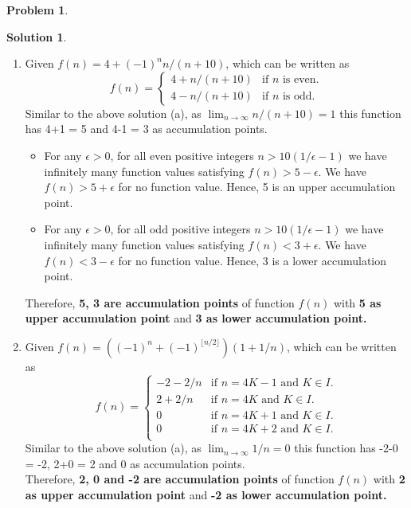\documentclass{article}
\theoremstyle{definition}
\newtheorem{problem}{Problem}
\newtheorem*{solution}{Solution}
\begin{document}
\begin{problem}
\begin{solution}
\begin{enumerate}[label=(\Alph*)]
\item Given $f(n) = 4 + (-1)^nn/(n+10)$, which can be written as
\begin{equation}
  f(n)=\begin{cases}
    4 + n/(n+10) & \text{if $n$ is even}.\\
    4 - n/(n+10) & \text{if $n$ is odd}.
  \end{cases}
\end{equation}
Similar to the above solution (a), as $\lim_{n\to\infty}n/(n+10) = 1$ this function has 4+1 = 5 and 4-1 = 3 as accumulation points.
\begin{itemize}
    \item For any $\epsilon > 0$, for all even positive integers $n > 10(1/\epsilon - 1)$ we have infinitely many function values satisfying $f(n) > 5 - \epsilon$. We have $f(n) > 5 + \epsilon$ for no function value. Hence, 5 is an upper accumulation point.
    \item For any $\epsilon > 0$, for all odd positive integers $n > 10(1/\epsilon - 1)$ we have infinitely many function values satisfying $f(n) < 3 + \epsilon$. We have $f(n) < 3 - \epsilon$ for no function value. Hence, 3 is a lower accumulation point.
\end{itemize}
Therefore, \textbf{5, 3 are accumulation points} of function $f(n)$ with \textbf{5 as upper accumulation point} and \textbf{3 as lower accumulation point.}

\item Given $f(n) = ((-1)^n+(-1)^{\lfloor{n/2}\rfloor})(1 + 1/n)$, which can be written as
\begin{equation}
  f(n)=\begin{cases}
    -2 - 2/n & \text{if $n = 4K - 1$ and $K \in I$}.\\
    2 + 2/n & \text{if $n = 4K$ and $K \in I$}.\\
    0 & \text{if $n = 4K + 1$ and $K \in I$}.\\
    0 & \text{if $n = 4K + 2$ and $K \in I$}.\\
  \end{cases}
\end{equation}
Similar to the above solution (a), as $\lim_{n\to\infty}1/n = 0$ this function has -2-0 = -2, 2+0 = 2 and 0 as accumulation points. \\
Therefore, \textbf{2, 0 and -2 are accumulation points} of function $f(n)$ with \textbf{2 as upper accumulation point} and \textbf{-2 as lower accumulation point.}
\end{enumerate}
\end{solution}
\end{problem}
\end{document}
